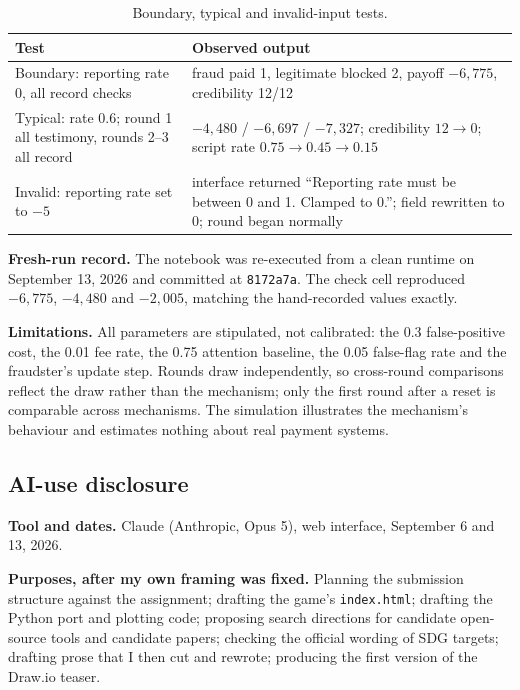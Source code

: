 \begin{table}[h]
\caption{Boundary, typical and invalid-input tests.}
\label{tab:tests}
\footnotesize
\begin{tabularx}{\columnwidth}{@{}lY@{}}
\toprule
Test & Observed output \\
\midrule
Boundary: reporting rate 0, all record checks & fraud paid 1, legitimate blocked 2, payoff $-6{,}775$, credibility 12/12 \\
Typical: rate 0.6; round 1 all testimony, rounds 2--3 all record & $-4{,}480$ / $-6{,}697$ / $-7{,}327$; credibility $12\rightarrow0$; script rate $0.75\rightarrow0.45\rightarrow0.15$ \\
Invalid: reporting rate set to $-5$ & interface returned ``Reporting rate must be between 0 and 1. Clamped to 0.''; field rewritten to 0; round began normally \\
\bottomrule
\end{tabularx}
\end{table}

\textbf{Fresh-run record.} The notebook was re-executed from a clean runtime on September 13, 2026 and committed at \texttt{8172a7a}. The check cell reproduced $-6{,}775$, $-4{,}480$ and $-2{,}005$, matching the hand-recorded values exactly.

\textbf{Limitations.} All parameters are stipulated, not calibrated: the 0.3 false-positive cost, the 0.01 fee rate, the 0.75 attention baseline, the 0.05 false-flag rate and the fraudster's update step. Rounds draw independently, so cross-round comparisons reflect the draw rather than the mechanism; only the first round after a reset is comparable across mechanisms. The simulation illustrates the mechanism's behaviour and estimates nothing about real payment systems.

\subsection{AI-use disclosure}
\label{app:ai}

\textbf{Tool and dates.} Claude (Anthropic, Opus 5), web interface, September 6 and 13, 2026.

\textbf{Purposes, after my own framing was fixed.} Planning the submission structure against the assignment; drafting the game's \texttt{index.html}; drafting the Python port and plotting code; proposing search directions for candidate open-source tools and candidate papers; checking the official wording of SDG targets; drafting prose that I then cut and rewrote; producing the first version of the Draw.io teaser.

